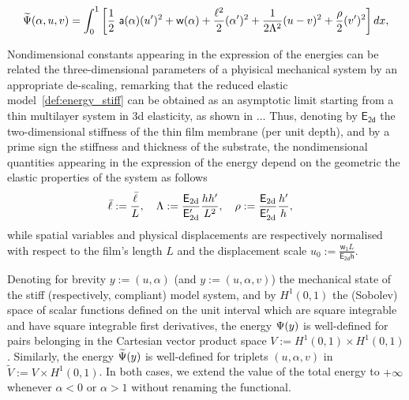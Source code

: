 \begin{equation}
    \label{def:energy_compliant}
    \Ecompl(\alpha, u,  v) = \int_{0}^1 \left[ \frac{1}{2} \ \soften(\alpha)(u')^2 + \homogdiss(\alpha) + \frac{\damagell^2}{2}(\alpha')^2 
    + \frac{1}{2 \elastell^2} (u- v)^2 
    + \frac{\stiffratio}{2}  (v')^2 \right] dx,
\end{equation}



Nondimensional constants appearing in the expression of the energies can be related the three-dimensional parameters of a phyisical mechanical system by an appropriate de-scaling, remarking that the reduced elastic model~\eqref{def:energy_stiff} can be obtained as an asymptotic limit starting from a thin multilayer system in 3d elasticity, as shown in ...
Thus, denoting by $\mathsf{E_\text{2d}}$ the two-dimensional stiffness of the thin film membrane (per unit depth), and by a prime sign the stiffness and thickness of the substrate, the nondimensional quantities appearing in the expression of the energy depend on the geometric the elastic properties of the system as follows
\begin{equation}
    \label{def:dimensional_parameters}
    \bar{\ell} := \frac{\bar{\ell}}{L}, \quad
    \Lambda := \frac{\mathsf{E_{\text{2d}}}}{\mathsf{E'_{\text{2d}}}}\frac{h h'}{L^2}, \quad
    \rho := \frac{\mathsf{E_{\text{2d}}}}{\mathsf{E'_{\text{2d}}}}\frac{h'}{h}, \quad
\end{equation}
while spatial variables and physical displacements are respectively normalised with respect to the film's length $L$ and the displacement scale $u_0 := \frac{\mathsf{w_1}L}{\mathsf{E_{\text{2d}} h}}$.





Denoting for brevity $y:=(u, \alpha)$ (and $y:=(u, \alpha, v)$) the mechanical state of the stiff (respectively, compliant) model system, and by $H^1(0, 1)$ the (Sobolev) space of scalar functions defined on the unit interval which are square integrable and have square integrable first derivatives, the energy $\Psi(y)$ is well-defined for pairs belonging in the Cartesian vector product space $V:=H^1(0,1)\times  H^1(0,1)$. Similarly, the energy $\widetilde\Psi(y)$ is well-defined for triplets $(u, \alpha, v)$ in $\widetilde V:=V\times  H^1(0,1)$. In both cases, we extend the value of the total energy to $+\infty$ whenever $\alpha < 0$ or $\alpha > 1$ without renaming the functional.

